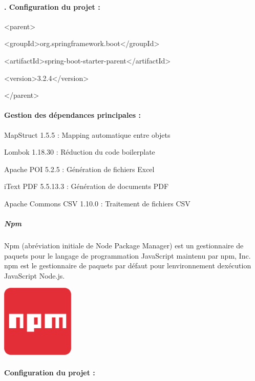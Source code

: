 \documentclass[12pt,a4paper,twoside]{report}
\begin{document}
\hypertarget{configuration-du-projet}{%
\paragraph{. Configuration du projet :}\label{configuration-du-projet}}

\textless parent\textgreater{}

\textless groupId\textgreater org.springframework.boot\textless/groupId\textgreater{}

\textless artifactId\textgreater spring-boot-starter-parent\textless/artifactId\textgreater{}

\textless version\textgreater3.2.4\textless/version\textgreater{}

\textless/parent\textgreater{}

\hypertarget{gestion-des-duxe9pendances-principales}{%
\paragraph{Gestion des dépendances principales
:}\label{gestion-des-duxe9pendances-principales}}

MapStruct 1.5.5 : Mapping automatique entre objets

Lombok 1.18.30 : Réduction du code boilerplate

Apache POI 5.2.5 : Génération de fichiers Excel

iText PDF 5.5.13.3 : Génération de documents PDF

Apache Commons CSV 1.10.0 : Traitement de fichiers CSV

\hypertarget{npm}{%
\subparagraph{Npm}\label{npm}}

Npm (abréviation initiale de Node Package Manager) est un gestionnaire
de paquets pour le langage de programmation JavaScript maintenu par npm,
Inc. npm est le gestionnaire de paquets par défaut pour
l\textquotesingle environnement d\textquotesingle exécution JavaScript
Node.js.

\includegraphics[width=1.36319in,height=1.36319in]{latex_media/media/image28.png}

\hypertarget{configuration-du-projet-1}{%
\paragraph{Configuration du projet :}\label{configuration-du-projet-1}}
\end{document}
